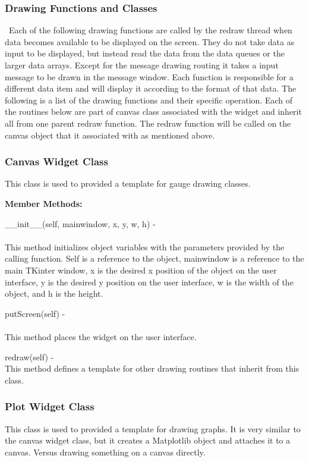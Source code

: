 \documentclass[10pt,draftclsnofoot,onecolumn,compsoc]{IEEEtran}
\begin{document}
\subsubsection{Drawing Functions and Classes}\
Each of the following drawing functions are called by the redraw thread when data becomes available to be displayed on the screen. They do not take data as input to be displayed, but instead read the data from the data queues or the larger data arrays. Except for the message drawing routing it takes a input message to be drawn in the message window. Each function is responsible for a different data item and will display it according to the format of that data. The following is a list of the drawing functions and their specific operation. Each of the routines below are part of canvas class associated with the widget and inherit all from one parent redraw function. The redraw function will be called on the canvas object that it associated with as mentioned above.

\subsubsection{Canvas Widget Class}
This class is used to provided a template for gauge drawing classes.

{\bf Member Methods:} \par

 \_\_init\_\_(self, mainwindow, x, y, w, h) - \\ \\
This method initializes object variables with the parameters provided by the calling function. Self is a reference to the object, mainwindow is a reference to the main TKinter window, x is the desired x position of the object on the user interface, y is the desired y position on the user interface, w is the width of the object, and h is the height. \par

putScreen(self) - \\ \\
This method places the widget on the user interface. \par

redraw(self) - \\
This method defines a template for other drawing routines that inherit from this class.

\subsubsection{Plot Widget Class}
This class is used to provided a template for drawing graphs. It is very similar to the canvas widget class, but it creates a Matplotlib object and attaches it to a canvas. Versus drawing something on a canvas directly.
\end{document}
